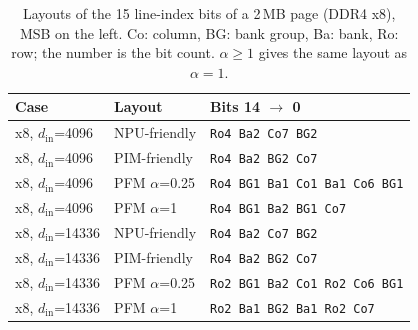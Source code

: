 \begin{table}[t]
\centering
\caption{Layouts of the 15 line-index bits of a 2\,MB page (DDR4 x8), MSB on the left. Co: column, BG: bank group, Ba: bank, Ro: row; the number is the bit count. $\alpha{\ge}1$ gives the same layout as $\alpha{=}1$.}
\label{tab:layouts}
\setlength{\tabcolsep}{3pt}
\begin{tabular}{lll}
\toprule
Case & Layout & Bits 14 $\rightarrow$ 0 \\
\midrule
x8, $d_{\mathrm{in}}$=4096 & NPU-friendly & \texttt{Ro4 Ba2 Co7 BG2} \\
x8, $d_{\mathrm{in}}$=4096 & PIM-friendly & \texttt{Ro4 Ba2 BG2 Co7} \\
x8, $d_{\mathrm{in}}$=4096 & PFM $\alpha$=0.25 & \texttt{Ro4 BG1 Ba1 Co1 Ba1 Co6 BG1} \\
x8, $d_{\mathrm{in}}$=4096 & PFM $\alpha$=1 & \texttt{Ro4 BG1 Ba2 BG1 Co7} \\
x8, $d_{\mathrm{in}}$=14336 & NPU-friendly & \texttt{Ro4 Ba2 Co7 BG2} \\
x8, $d_{\mathrm{in}}$=14336 & PIM-friendly & \texttt{Ro4 Ba2 BG2 Co7} \\
x8, $d_{\mathrm{in}}$=14336 & PFM $\alpha$=0.25 & \texttt{Ro2 BG1 Ba2 Co1 Ro2 Co6 BG1} \\
x8, $d_{\mathrm{in}}$=14336 & PFM $\alpha$=1 & \texttt{Ro2 Ba1 BG2 Ba1 Ro2 Co7} \\
\bottomrule
\end{tabular}
\end{table}
